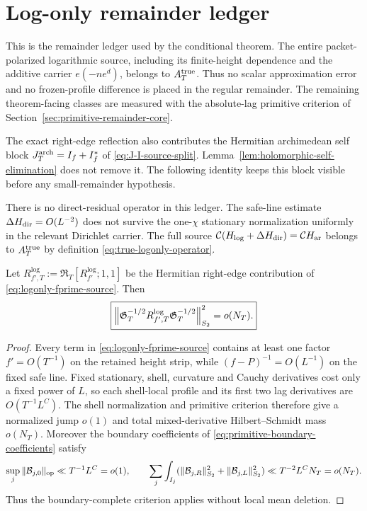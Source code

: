 \section{Log-only remainder ledger}
\label{sec:logonly-remainder-ledger}

This is the remainder ledger used by the conditional theorem.  The entire
packet-polarized logarithmic source, including its finite-height dependence and
the additive carrier $e(-ne^d)$, belongs to $A_T^{\rm true}$.  Thus no scalar
approximation error and no frozen-profile difference is placed in the regular
remainder.  The remaining theorem-facing classes are measured with the
absolute-lag primitive criterion of
Section~\ref{sec:primitive-remainder-core}.

The exact right-edge reflection also contributes the Hermitian archimedean
self block $J_T^{\rm arch}=I_f+I_f^*$ of \eqref{eq:J-I-source-split}.
Lemma~\ref{lem:holomorphic-self-elimination} does not remove it. The following
identity keeps this block visible before any small-remainder hypothesis.

There is no direct-residual operator in this ledger.  The safe-line estimate
$\Delta H_{\rm dir}=O(L^{-2})$ does not survive the one-$\chi$ stationary
normalization uniformly in the relevant Dirichlet carrier.  The full source
$\mathcal C(H_{\log}+\Delta H_{\rm dir})=\mathcal C H_{\rm ar}$ belongs to
$A_T^{\rm true}$ by definition \eqref{eq:true-logonly-operator}.

\begin{lemma}
\label{lem:logonly-fprime-relative-regular}
Let $R_{f',T}^{\log}:=\mathfrak R_T[R_{f'}^{\log};1,1]$ be the Hermitian
right-edge contribution of \eqref{eq:logonly-fprime-source}. Then
\begin{equation}
\boxed{
\left\|\mathfrak G_T^{-1/2}R_{f',T}^{\log}\mathfrak G_T^{-1/2}\right\|_{S_2}^2=o(N_T).
}
\label{eq:logonly-fprime-relative-HS}
\end{equation}
\end{lemma}

\begin{proof}
Every term in \eqref{eq:logonly-fprime-source} contains at least one factor
$f'=O(T^{-1})$ on the retained height strip, while
$(f-P)^{-1}=O(L^{-1})$ on the fixed safe line.  Fixed stationary, shell,
curvature and Cauchy derivatives cost only a fixed power of $L$, so each
shell-local profile and its first two lag derivatives are $O(T^{-1}L^C)$.
The shell normalization and primitive criterion therefore give a normalized
jump $o(1)$ and total mixed-derivative Hilbert--Schmidt mass $o(N_T)$.
Moreover the boundary coefficients of
\eqref{eq:primitive-boundary-coefficients} satisfy
\[
\sup_j\|\mathcal B_{j,0}\|_{\operatorname{op}}\ll T^{-1}L^C=o(1),
\qquad
\sum_j\int_{I_j}(\|\mathcal B_{j,R}\|_{S_2}^2
+\|\mathcal B_{j,L}\|_{S_2}^2)
\ll T^{-2}L^CN_T=o(N_T).
\]
Thus the boundary-complete criterion applies without local mean deletion.
\end{proof}

